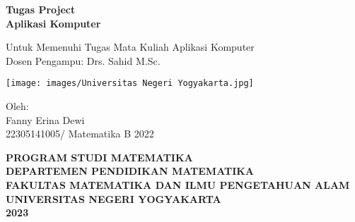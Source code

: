 \documentclass[12pt,Times new roman,letterpaper]{book}
\begin{document}
\clearpage
\thispagestyle{empty}
\frontmatter
\begin{center}
    \huge{\textbf{Tugas Project \\ Aplikasi Komputer}}
\end{center}
\begin{center}
    \large{Untuk Memenuhi Tugas Mata Kuliah Aplikasi Komputer \\ Dosen Pengampu: Drs. Sahid M.Sc.}
\end{center}
\vspace{2cm}
\begin{minipage}{17cm}
    \begin{center}
        \texttt{[image: images/Universitas Negeri Yogyakarta.jpg]}
    \end{center}
\end{minipage}

\vspace{3cm}

\begin{center}
    \large{Oleh: \\ Fanny Erina Dewi \\ 22305141005/ Matematika B 2022}
\end{center}

\vspace{4cm}
\begin{center}
    \large{\textbf{PROGRAM STUDI MATEMATIKA}} \\
    \large{\textbf{DEPARTEMEN PENDIDIKAN MATEMATIKA}} \\
    \large{\textbf{FAKULTAS MATEMATIKA DAN ILMU PENGETAHUAN ALAM}} \\
    \large{\textbf{UNIVERSITAS NEGERI YOGYAKARTA}} \\
    \large{\textbf{2023}}
\end{center}
\clearpage

\thispagestyle{empty}
\tableofcontents
\mainmatter
\end{document}
